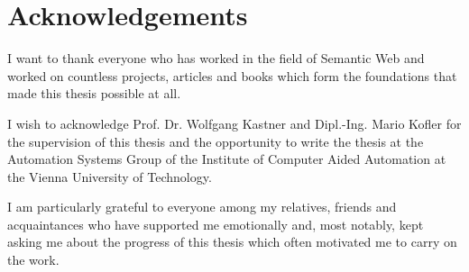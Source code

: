 \chapter*{Acknowledgements}

I want to thank everyone who has worked in the field of Semantic Web and worked on countless projects, articles and books which form the foundations that made this thesis possible at all.

I wish to acknowledge Prof. Dr. Wolfgang Kastner and Dipl.-Ing. Mario Kofler for the supervision of this thesis and the opportunity to write the thesis at the Automation Systems Group of the Institute of Computer Aided Automation at the Vienna University of Technology.

I am particularly grateful to everyone among my relatives, friends and acquaintances who have supported me emotionally and, most notably, kept asking me about the progress of this thesis which often motivated me to carry on the work.
